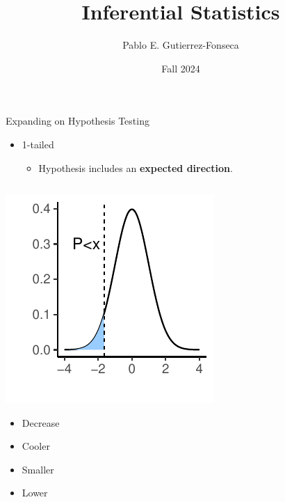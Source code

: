 \documentclass[
  ignorenonframetext,
]{beamer}
\title{Inferential Statistics}
\author{Pablo E. Gutierrez-Fonseca}
\date{Fall 2024}
\providecommand{\tightlist}{%
  \setlength{\itemsep}{0pt}\setlength{\parskip}{0pt}}
\begin{document}
\frame{\titlepage}

\begin{frame}{Expanding on Hypothesis Testing}
\label{expanding-on-hypothesis-testing}
\begin{itemize}
\tightlist
\item
  1-tailed

  \begin{itemize}
  \tightlist
  \item
    Hypothesis includes an \textbf{expected direction}.
  \end{itemize}
\end{itemize}

\begin{columns}[T]
\begin{column}{0.5\textwidth}
\vspace{1cm}

\includegraphics{Inferential-Stat-and-Z-test_files/figure-beamer/unnamed-chunk-1-1.pdf}

\centering

\tiny

\begin{itemize}
\tightlist
\item
  Decrease
\item
  Cooler
\item
  Smaller
\item
  Lower\\
\end{itemize}

\hfill\break
\end{column}

\begin{column}{0.5\textwidth}
\vspace{1cm}


\end{column}
\end{columns}
\end{frame}
\end{document}
